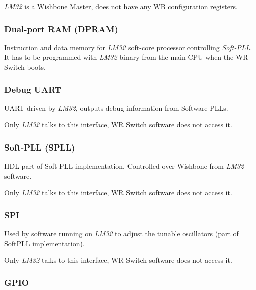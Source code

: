 \emph{LM32} is a Wishbone Master, does not have any WB configuration registers.

\subsubsection{Dual-port RAM (DPRAM)}

Instruction and data memory for \emph{LM32} soft-core processor
controlling \emph{Soft-PLL}. It has to be programmed with \emph{LM32} binary
from the main CPU when the WR Switch boots.

\subsubsection{Debug UART}

UART driven by \emph{LM32}, outputs debug information from Software PLLs.\\


Only \emph{LM32} talks to this interface, WR Switch software does not access it.

\subsubsection{Soft-PLL (SPLL)}

HDL part of Soft-PLL implementation. Controlled over Wishbone from \emph{LM32}
software.\\


Only \emph{LM32} talks to this interface, WR Switch software does not access it.

\subsubsection{SPI}

Used by software running on \emph{LM32} to adjust the tunable oscillators (part
of SoftPLL implementation).\\


Only \emph{LM32} talks to this interface, WR Switch software does not access it.

\subsubsection{GPIO}

